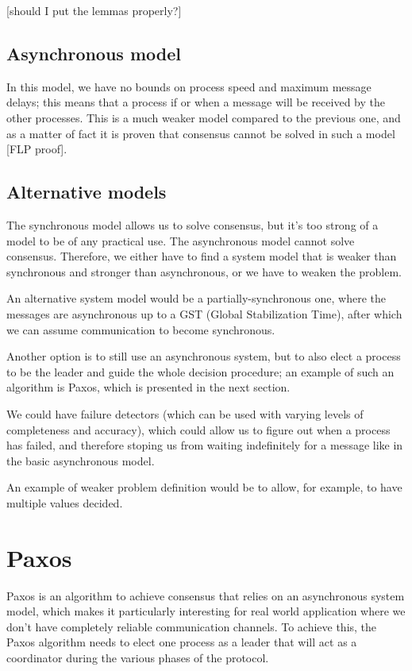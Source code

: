 [should I put the lemmas properly?]

\subsection{Asynchronous model}\label{sec:Asynchronous model}
In this model, we have no bounds on process speed and maximum message delays; this means that a process if or when a message will be received by the other processes. This is a much weaker model compared to the previous one, and as a matter of fact it is proven that consensus cannot be solved in such a model [FLP proof].

\subsection{Alternative models}\label{sec:Alternative models}
The synchronous model allows us to solve consensus, but it's too strong of a model to be of any practical use. The asynchronous model cannot solve consensus. Therefore, we either have to find a system model that is weaker than synchronous and stronger than asynchronous, or we have to weaken the problem.

An alternative system model would be a partially-synchronous one, where the messages are asynchronous up to a GST (Global Stabilization Time), after which we can assume communication to become synchronous.

Another option is to still use an asynchronous system, but to also elect a process to be the leader and guide the whole decision procedure; an example of such an algorithm is Paxos, which is presented in the next section.

We could have failure detectors (which can be used with varying levels of completeness and accuracy), which could allow us to figure out when a process has failed, and therefore stoping us from waiting indefinitely for a message like in the basic asynchronous model.

An example of weaker problem definition would be to allow, for example, to have multiple values decided.

\section{Paxos}\label{sec:Paxos}
Paxos is an algorithm to achieve consensus that relies on an asynchronous system model, which makes it particularly interesting for real world application where we don't have completely reliable communication channels. To achieve this, the Paxos algorithm needs to elect one process as a leader that will act as a coordinator during the various phases of the protocol.

